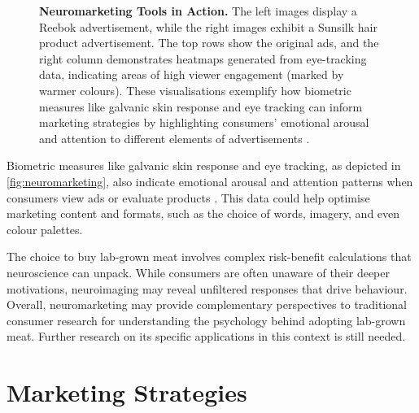 \documentclass[10pt]{article}
\begin{document}
\begin{sloppypar}
  \begin{figure}[ht]
    \centering
    \caption[Neuromarketing Tools in Action.]{\textbf{Neuromarketing Tools in Action.} The left images display a Reebok advertisement, while the right images exhibit a Sunsilk hair product advertisement. The top rows show the original ads, and the right column demonstrates heatmaps generated from eye-tracking data, indicating areas of high viewer engagement (marked by warmer colours). These visualisations exemplify how biometric measures like galvanic skin response and eye tracking can inform marketing strategies by highlighting consumers’ emotional arousal and attention to different elements of advertisements \citep{brandlab_nevromarketing_nodate}.}
    \label{fig:neuromarketing}
  \end{figure}

  Biometric measures like galvanic skin response and eye tracking, as depicted in \autoref{fig:neuromarketing}, also indicate emotional arousal and attention patterns when consumers view ads or evaluate products \citep{riedl_decade_2020}. This data could help optimise marketing content and formats, such as the choice of words, imagery, and even colour palettes.

  The choice to buy lab-grown meat involves complex risk-benefit calculations that neuroscience can unpack. While consumers are often unaware of their deeper motivations, neuroimaging may reveal unfiltered responses that drive behaviour. Overall, neuromarketing may provide complementary perspectives to traditional consumer research for understanding the psychology behind adopting lab-grown meat. Further research on its specific applications in this context is still needed.

  \section{Marketing Strategies}
  \label{sec:marketing-strategies}


\end{sloppypar}
\end{document}

